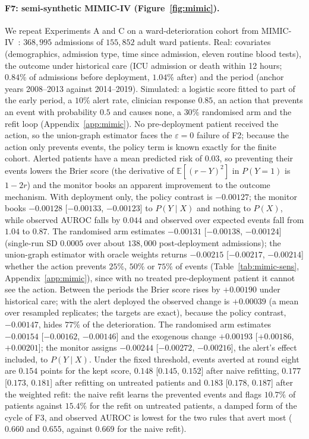\documentclass[letterpaper]{article} %
\newcommand{\E}{\mathbb{E}}
\begin{document}
\paragraph{F7: semi-synthetic MIMIC-IV (Figure~\ref{fig:mimic}).} We repeat
Experiments A and C on a ward-deterioration cohort from
MIMIC-IV~\citep{johnson2023mimic}: $368{,}995$ admissions of $155{,}852$
adult ward patients. Real: covariates (demographics, admission type, time
since admission, eleven routine blood tests), the outcome under historical
care (ICU admission or death within 12 hours; $0.84\%$ of admissions before
deployment, $1.04\%$ after) and the period (anchor years 2008--2013 against
2014--2019). Simulated: a logistic score fitted to part of the early period,
a $10\%$ alert rate, clinician response $0.85$, an action that prevents an
event with probability $0.5$ and causes none, a $30\%$ randomised arm and the
refit loop (Appendix~\ref{app:mimic}). No pre-deployment patient received the
action, so the union-graph estimator faces the $\varepsilon = 0$ failure of
F2; because the action only prevents events, the policy term is known exactly
for the finite cohort. Alerted patients have a mean predicted risk of $0.03$,
so preventing their events lowers the Brier score (the derivative of
$\E[(r - Y)^2]$ in $P(Y{=}1)$ is $1 - 2r$) and the monitor books an apparent
improvement to the outcome mechanism. With deployment only, the policy
contrast is $-0.00127$; the monitor books $-0.00128$ [$-0.00133$, $-0.00123$]
to $P(Y \mid X)$ and nothing to $P(X)$, while observed AUROC falls by $0.044$
and observed over expected events fall from $1.04$ to $0.87$. The randomised
arm estimates $-0.00131$ [$-0.00138$, $-0.00124$] (single-run SD $0.0005$
over about $138{,}000$ post-deployment admissions); the union-graph estimator
with oracle weights returns $-0.00215$ [$-0.00217$, $-0.00214$] whether the
action prevents $25\%$,
$50\%$ or $75\%$ of events (Table~\ref{tab:mimic-sens}, Appendix~\ref{app:mimic}),
since with no
treated pre-deployment patient it cannot see the action. Between the periods
the Brier score rises by $+0.00190$ under historical care; with the alert
deployed the observed change is $+0.00039$ (a mean over resampled
replicates; the targets are exact), because the policy contrast,
$-0.00147$, hides $77\%$ of the deterioration. The randomised arm estimates
$-0.00154$ [$-0.00162$, $-0.00146$] and the exogenous change $+0.00193$
[$+0.00186$, $+0.00201$]; the monitor assigns $-0.00244$ [$-0.00272$,
$-0.00216$], the alert's effect included, to $P(Y \mid X)$. Under the fixed
threshold, events averted at round eight are $0.154$ points for the kept
score, $0.148$ [$0.145$, $0.152$] after naive refitting, $0.177$ [$0.173$,
$0.181$] after refitting on untreated patients and $0.183$ [$0.178$, $0.187$]
after the weighted refit: the naive refit learns the
prevented events and flags $10.7\%$ of patients against $15.4\%$ for the
refit on untreated patients, a damped form of the cycle of F3, and observed
AUROC is lowest for the two rules that avert most ($0.660$ and $0.655$,
against $0.669$ for the naive refit).
\end{document}
